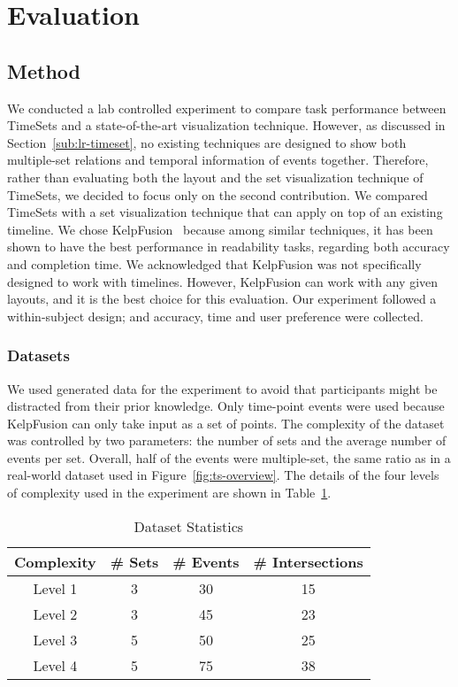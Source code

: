 \section{Evaluation}

\subsection{Method}
We conducted a lab controlled experiment to compare task performance between TimeSets and a state-of-the-art visualization technique. However, as discussed in Section~\ref{sub:lr-timeset}, no existing techniques are designed to show both multiple-set relations and temporal information of events together. Therefore, rather than evaluating both the layout and the set visualization technique of TimeSets, we decided to focus only on the second contribution. We compared TimeSets with a set visualization technique that can apply on top of an existing timeline. We chose KelpFusion~\cite{Meulemans2013} because among similar techniques, it has been shown to have the best performance in readability tasks, regarding both accuracy and completion time. We acknowledged that KelpFusion was not specifically designed to work with timelines. However, KelpFusion can work with any given layouts, and it is the best choice for this evaluation. Our experiment followed a within-subject design; and accuracy, time and user preference were collected.
 
\subsubsection{Datasets}
We used generated data for the experiment to avoid that participants might be distracted from their prior knowledge. Only time-point events were used because KelpFusion can only take input as a set of points. The complexity of the dataset was controlled by two parameters: the number of sets and the average number of events per set. Overall, half of the events were multiple-set, the same ratio as in a real-world dataset used in Figure~\ref{fig:ts-overview}. The details of the four levels of complexity used in the experiment are shown in Table~\ref{table:dataset}.

\begin{table}[ht]
\centering
\sffamily\small
\caption{Dataset Statistics}
\label{table:dataset}
\begin{tabular}{cccc}
	\toprule
	\textbf{Complexity} & \textbf{\# Sets} & \textbf{\# Events} & \textbf{\# Intersections} \\ 
	\midrule
	Level 1 & 3 & 30 & 15 \\ 
	Level 2 & 3 & 45 & 23 \\ 
	Level 3 & 5 & 50 & 25 \\ 
	Level 4 & 5 & 75 & 38 \\ 
	\bottomrule
\end{tabular} 
\end{table}

